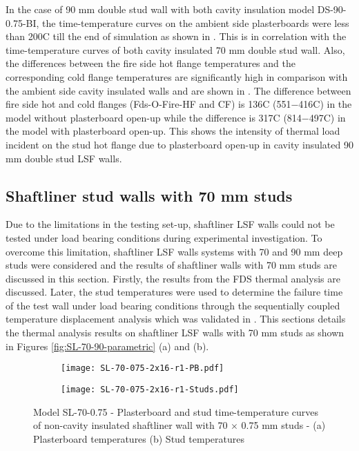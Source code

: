 In the case of 90 mm double stud wall with both cavity insulation model DS-90-0.75-BI, the time-temperature curves on the ambient side plasterboards were less than 200\degree C till the end of simulation as shown in . This is in correlation with the time-temperature curves of both cavity insulated 70 mm double stud wall. Also, the differences between the fire side hot flange temperatures and the corresponding cold flange temperatures are significantly high in comparison with the ambient side cavity insulated walls and are shown in . The difference between fire side hot and cold flanges (Fds-O-Fire-HF and CF) is 136\degree C (551\degree$-$416\degree C) in the model without plasterboard open-up while the difference is 317\degree C (814\degree$-$497\degree C) in the model with plasterboard open-up. This shows the intensity of thermal load incident on the stud hot flange due to plasterboard open-up in cavity insulated 90 mm double stud LSF walls.   

\subsection{Shaftliner stud walls with 70 mm studs}

Due to the limitations in the testing set-up, shaftliner LSF walls could not be tested under load bearing conditions during experimental investigation. To overcome this limitation, shaftliner LSF walls systems with 70 and 90 mm deep studs were considered and the results of shaftliner walls with 70 mm studs are discussed in this section. Firstly, the results from the FDS thermal analysis are discussed. Later, the stud temperatures were used to determine the failure time of the test wall under load bearing conditions through the sequentially coupled temperature displacement analysis which was validated in . This sections details the thermal analysis results on shaftliner LSF walls with 70 mm studs as shown in Figures \ref{fig:SL-70-90-parametric} (a) and (b).
\begin{figure}[!htbp]
	\centering
	\begin{subfigure}[b]{0.6\textwidth}
		\centering
		\texttt{[image: SL-70-075-2x16-r1-PB.pdf]}
		\caption{}
		\label{subfig:SL-70-075-2x16-r1-PB}
	\end{subfigure}
	\begin{subfigure}[b]{0.6\textwidth}
		\centering
		\texttt{[image: SL-70-075-2x16-r1-Studs.pdf]}
		\caption{}
		\label{subfig:SL-70-075-2x16-r1-Studs}
	\end{subfigure}
	   \caption{Model SL-70-0.75 - Plasterboard and stud time-temperature curves of non-cavity insulated shaftliner wall with 70 $\times$ 0.75 mm studs - (a) Plasterboard temperatures (b) Stud temperatures}
	   \label{fig:SL-70-075-2x16-r1}
\end{figure}

